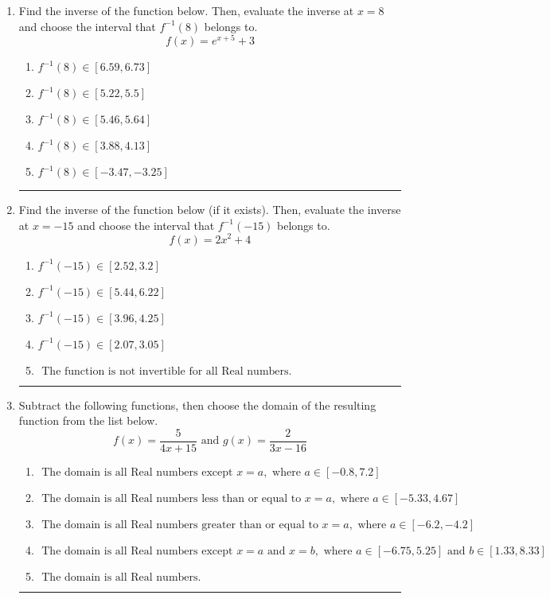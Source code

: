 \documentclass[14pt]{extbook}
\newcommand{\litem}[1]{\item#1\hspace*{-1cm}\rule{\textwidth}{0.4pt}}
\begin{document}
\begin{enumerate}
{\begin{enumerate}[label=\Alph*.]
\end{enumerate} }
\litem{
Find the inverse of the function below. Then, evaluate the inverse at $x = 8$ and choose the interval that $f^{-1}(8)$ belongs to.\[ f(x) = e^{x+5}+3 \]\begin{enumerate}[label=\Alph*.]
\item \( f^{-1}(8) \in [6.59, 6.73] \)
\item \( f^{-1}(8) \in [5.22, 5.5] \)
\item \( f^{-1}(8) \in [5.46, 5.64] \)
\item \( f^{-1}(8) \in [3.88, 4.13] \)
\item \( f^{-1}(8) \in [-3.47, -3.25] \)

\end{enumerate} }
\litem{
Find the inverse of the function below (if it exists). Then, evaluate the inverse at $x = -15$ and choose the interval that $f^{-1}(-15)$ belongs to.\[ f(x) = 2 x^2 + 4 \]\begin{enumerate}[label=\Alph*.]
\item \( f^{-1}(-15) \in [2.52, 3.2] \)
\item \( f^{-1}(-15) \in [5.44, 6.22] \)
\item \( f^{-1}(-15) \in [3.96, 4.25] \)
\item \( f^{-1}(-15) \in [2.07, 3.05] \)
\item \( \text{ The function is not invertible for all Real numbers. } \)

\end{enumerate} }
\litem{
Subtract the following functions, then choose the domain of the resulting function from the list below.\[ f(x) = \frac{5}{4x+15} \text{ and } g(x) = \frac{2}{3x-16} \]\begin{enumerate}[label=\Alph*.]
\item \( \text{ The domain is all Real numbers except } x = a, \text{ where } a \in [-0.8, 7.2] \)
\item \( \text{ The domain is all Real numbers less than or equal to } x = a, \text{ where } a \in [-5.33, 4.67] \)
\item \( \text{ The domain is all Real numbers greater than or equal to } x = a, \text{ where } a \in [-6.2, -4.2] \)
\item \( \text{ The domain is all Real numbers except } x = a \text{ and } x = b, \text{ where } a \in [-6.75, 5.25] \text{ and } b \in [1.33, 8.33] \)
\item \( \text{ The domain is all Real numbers. } \)


\end{enumerate}}
\end{enumerate}
\end{document}
